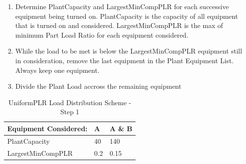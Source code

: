 \begin{enumerate}
    \def\labelenumi{Step \arabic{enumi}:}
\item
    Determine PlantCapacity and LargestMinCompPLR for each successive equipment being turned on.
    PlantCapacity is the capacity of all equipment that is turned on and considered.
    LargestMinCompPLR is the max of minimum Part Load Ratio for each equipment considered.
\item
    While the load to be met is below the LargestMinCompPLR equipment still in consideration, remove the last equipment in the Plant Equipment List. Always keep one equipment.
\item
    Divide the Plant Load accross the remaining equipment
\end{enumerate}


\begin{table}[htbp]
    \centering
    \caption{UniformPLR Load Distribution Scheme - Step 1}
    \label{tab:uniformplr-load-overview}
\begin{tabular}{|l|l|l|}
\hline
Equipment Considered: & A & A \& B \\ \hline
PlantCapacity & 40 & 140 \\ \hline
LargestMinCompPLR & 0.2 & 0.15 \\ \hline
\end{tabular}
\end{table}

